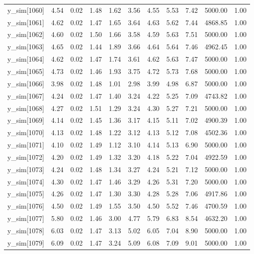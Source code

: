 \begin{table}[ht]
\begin{tabular}{rrrrrrrrrrr}
  y\_sim[1060] & 4.54 & 0.02 & 1.48 & 1.62 & 3.56 & 4.55 & 5.53 & 7.42 & 5000.00 & 1.00 \\ 
  y\_sim[1061] & 4.62 & 0.02 & 1.47 & 1.65 & 3.64 & 4.63 & 5.62 & 7.44 & 4868.85 & 1.00 \\ 
  y\_sim[1062] & 4.60 & 0.02 & 1.50 & 1.66 & 3.58 & 4.59 & 5.63 & 7.51 & 5000.00 & 1.00 \\ 
  y\_sim[1063] & 4.65 & 0.02 & 1.44 & 1.89 & 3.66 & 4.64 & 5.64 & 7.46 & 4962.45 & 1.00 \\ 
  y\_sim[1064] & 4.62 & 0.02 & 1.47 & 1.74 & 3.61 & 4.62 & 5.63 & 7.47 & 5000.00 & 1.00 \\ 
  y\_sim[1065] & 4.73 & 0.02 & 1.46 & 1.93 & 3.75 & 4.72 & 5.73 & 7.68 & 5000.00 & 1.00 \\ 
  y\_sim[1066] & 3.98 & 0.02 & 1.48 & 1.01 & 2.98 & 3.99 & 4.98 & 6.87 & 5000.00 & 1.00 \\ 
  y\_sim[1067] & 4.24 & 0.02 & 1.47 & 1.40 & 3.24 & 4.22 & 5.25 & 7.09 & 4743.82 & 1.00 \\ 
  y\_sim[1068] & 4.27 & 0.02 & 1.51 & 1.29 & 3.24 & 4.30 & 5.27 & 7.21 & 5000.00 & 1.00 \\ 
  y\_sim[1069] & 4.14 & 0.02 & 1.45 & 1.36 & 3.17 & 4.15 & 5.11 & 7.02 & 4900.39 & 1.00 \\ 
  y\_sim[1070] & 4.13 & 0.02 & 1.48 & 1.22 & 3.12 & 4.13 & 5.12 & 7.08 & 4502.36 & 1.00 \\ 
  y\_sim[1071] & 4.10 & 0.02 & 1.49 & 1.12 & 3.10 & 4.14 & 5.13 & 6.90 & 5000.00 & 1.00 \\ 
  y\_sim[1072] & 4.20 & 0.02 & 1.49 & 1.32 & 3.20 & 4.18 & 5.22 & 7.04 & 4922.59 & 1.00 \\ 
  y\_sim[1073] & 4.24 & 0.02 & 1.48 & 1.34 & 3.27 & 4.24 & 5.21 & 7.12 & 5000.00 & 1.00 \\ 
  y\_sim[1074] & 4.30 & 0.02 & 1.47 & 1.46 & 3.29 & 4.26 & 5.31 & 7.20 & 5000.00 & 1.00 \\ 
  y\_sim[1075] & 4.26 & 0.02 & 1.47 & 1.30 & 3.30 & 4.28 & 5.28 & 7.06 & 4917.86 & 1.00 \\ 
  y\_sim[1076] & 4.50 & 0.02 & 1.49 & 1.55 & 3.50 & 4.50 & 5.52 & 7.46 & 4700.59 & 1.00 \\ 
  y\_sim[1077] & 5.80 & 0.02 & 1.46 & 3.00 & 4.77 & 5.79 & 6.83 & 8.54 & 4632.20 & 1.00 \\ 
  y\_sim[1078] & 6.03 & 0.02 & 1.47 & 3.13 & 5.02 & 6.05 & 7.04 & 8.90 & 5000.00 & 1.00 \\ 
  y\_sim[1079] & 6.09 & 0.02 & 1.47 & 3.24 & 5.09 & 6.08 & 7.09 & 9.01 & 5000.00 & 1.00 \\ 

\end{tabular}
\end{table}
